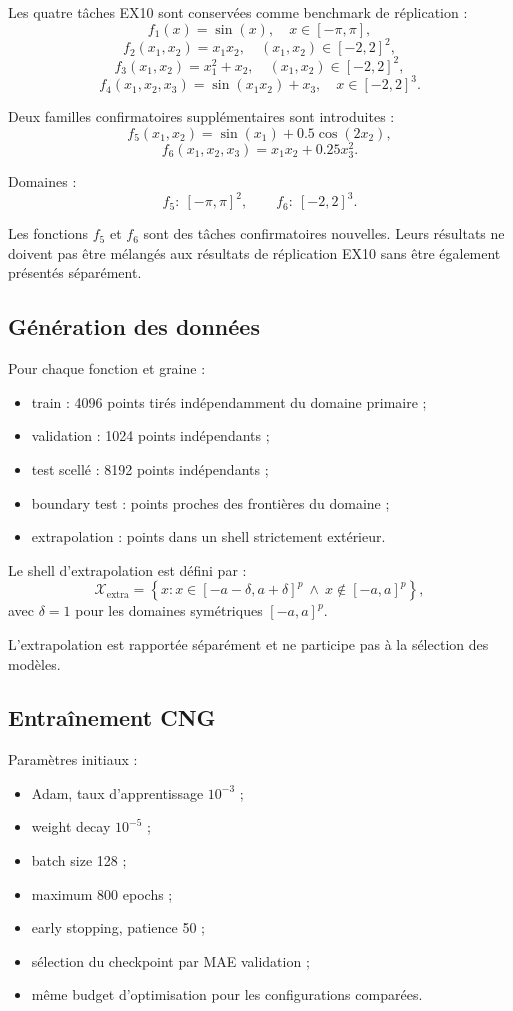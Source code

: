 \documentclass[11pt,a4paper]{article}
\begin{document}
Les quatre tâches EX10 sont conservées comme benchmark de réplication :
\[
f_1(x)=\sin(x),\quad x\in[-\pi,\pi],
\]
\[
f_2(x_1,x_2)=x_1x_2,\quad (x_1,x_2)\in[-2,2]^2,
\]
\[
f_3(x_1,x_2)=x_1^2+x_2,\quad (x_1,x_2)\in[-2,2]^2,
\]
\[
f_4(x_1,x_2,x_3)=\sin(x_1x_2)+x_3,\quad
x\in[-2,2]^3.
\]

Deux familles confirmatoires supplémentaires sont introduites :
\[
f_5(x_1,x_2)=\sin(x_1)+0.5\cos(2x_2),
\]
\[
f_6(x_1,x_2,x_3)=x_1x_2+0.25x_3^2.
\]

Domaines :
\[
f_5:\ [-\pi,\pi]^2,\qquad
f_6:\ [-2,2]^3.
\]

Les fonctions $f_5$ et $f_6$ sont des tâches confirmatoires nouvelles.
Leurs résultats ne doivent pas être mélangés aux résultats de réplication
EX10 sans être également présentés séparément.

\subsection{Génération des données}

Pour chaque fonction et graine :
\begin{itemize}
  \item train : 4096 points tirés indépendamment du domaine primaire ;
  \item validation : 1024 points indépendants ;
  \item test scellé : 8192 points indépendants ;
  \item boundary test : points proches des frontières du domaine ;
  \item extrapolation : points dans un shell strictement extérieur.
\end{itemize}

Le shell d'extrapolation est défini par :
\[
\mathcal{X}_{\mathrm{extra}}
=
\left\{x:
x\in[-a-\delta,a+\delta]^p
\ \land\
x\notin[-a,a]^p
\right\},
\]
avec $\delta=1$ pour les domaines symétriques $[-a,a]^p$.

L'extrapolation est rapportée séparément et ne participe pas à la
sélection des modèles.

\subsection{Entraînement CNG}

Paramètres initiaux :
\begin{itemize}
  \item Adam, taux d'apprentissage $10^{-3}$ ;
  \item weight decay $10^{-5}$ ;
  \item batch size 128 ;
  \item maximum 800 epochs ;
  \item early stopping, patience 50 ;
  \item sélection du checkpoint par MAE validation ;
  \item même budget d'optimisation pour les configurations comparées.
\end{itemize}
\end{document}
